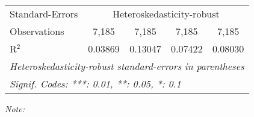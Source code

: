 \begin{table}[htbp!]
\begin{adjustbox}{width = 1\textwidth, max height = 0.95\textheight, center}
\begin{threeparttable}[b]
\begin{tabular}{lcccc}
            \midrule 
            Standard-Errors & \multicolumn{4}{c}{Heteroskedasticity-robust} \\ 
            Observations         & 7,185                          & 7,185                          & 7,185                          & 7,185\\  
            R$^2$                & 0.03869                        & 0.13047                        & 0.07422                        & 0.08030\\  
            \midrule \midrule
            \multicolumn{5}{l}{\emph{Heteroskedasticity-robust standard-errors in parentheses}}\\
            \multicolumn{5}{l}{\emph{Signif. Codes: ***: 0.01, **: 0.05, *: 0.1}}\\
         \end{tabular}
         
         \begin{tablenotes}\item \medskip \textit{Note:}
         \end{tablenotes}
      \end{threeparttable}
   \end{adjustbox}
\end{table}


